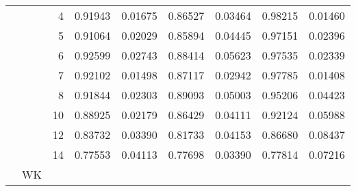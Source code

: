 \documentclass{article}
\theoremstyle{definition}
\begin{document}
\begin{table}[]
\begin{tabular}{|l|r|r|r|r|r|r|r|r|}
   &   & 4   &0.91943 &0.01675 &0.86527 &0.03464 &0.98215 &0.01460\\
   &   & 5   &0.91064 &0.02029 &0.85894 &0.04445 &0.97151 &0.02396\\
   &   & 6   &0.92599 &0.02743 &0.88414 &0.05623 &0.97535 &0.02339\\
   &   & 7   &0.92102 &0.01498 &0.87117 &0.02942 &0.97785 &0.01408\\
   &   & 8   &0.91844 &0.02303 &0.89093 &0.05003 &0.95206 &0.04423\\
   &   & 10  &0.88925 &0.02179 &0.86429 &0.04111 &0.92124 &0.05988\\
   &   & 12  &0.83732 &0.03390 &0.81733 &0.04153 &0.86680 &0.08437\\
   &   & 14  &0.77553 &0.04113 &0.77698 &0.03390 &0.77814 &0.07216\\ \cline{2-9} 
   & WK  &   &   & &   & &   & \\ \hline
\end{tabular}
\end{table}
\end{document}

